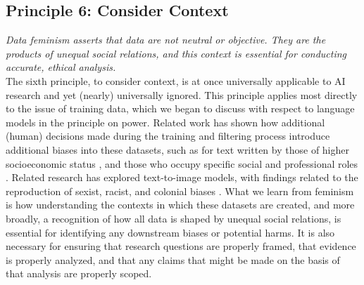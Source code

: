 \subsection{Principle 6: Consider Context}

\textit{Data feminism asserts that data are not neutral or objective. They are the products of unequal social relations, and this context is essential for conducting accurate, ethical analysis. }
\\[5pt]
The sixth principle, to consider context, is at once universally applicable to AI research and yet (nearly) universally ignored. This principle applies most directly to the issue of training data, which we began to  discuss with respect to language models in the principle on power. Related work has shown how additional (human) decisions made during the training and filtering process introduce additional biases into these datasets, such as for text written by those of higher socioeconomic status \cite{gururangan-etal-2022-whose}, and those who occupy specific social and professional roles \cite{Lucy_Gururangan_Soldaini_Strubell_Bamman_Klein_Dodge_2024}. Related research has explored text-to-image models, with findings related to the reproduction of sexist, racist, and colonial biases \cite{Nicoletti_Equality_2023, Qadri_Shelby_Bennett_Denton_2023}. What we learn from feminism is how understanding the contexts in which these datasets are created, and more broadly, a recognition of how all data is shaped by unequal social relations, is essential for identifying any downstream biases or potential harms. It is also necessary for ensuring that research questions are properly framed, that evidence is properly analyzed, and that any claims that might be made on the basis of that analysis are properly scoped.     


